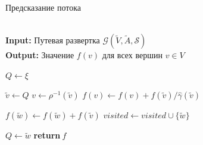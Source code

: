 \documentclass[14pt,autoref,href]{disser}
\theoremstyle{definition}
\begin{document}
\begin{algorithm}
\caption{Предсказание потока} \label{alg:flow_propagation}
\hspace*{\algorithmicindent} \\
\hspace*{\algorithmicindent} \textbf{Input:} Путевая развертка $\mathcal{G}(\widetilde{V}, \widetilde{A}, \mathscr{S})$ \\
\hspace*{\algorithmicindent} \textbf{Output:} Значение $f(v)$ для всех вершин $v\in V$
\begin{algorithmic}[1]
    \State $Q\gets \xi$
\EndFor

 \label{alg:flow_propagation:main_loop_begin}
    \State $\tilde{v}\gets Q$
    \State $v\gets \rho^{-1}(\tilde{v})$
    \State $f(v)\gets f(v) + f(\tilde{v}) / \hat{\gamma}(\tilde{v})$
    
        \State $f(\tilde{w})\gets f(\tilde{w}) + f(\tilde{v})$
        \State $visited\gets visited\cup \{\tilde{w}\}$
        
            \State $Q\gets \tilde{w}$
        \EndIf
    \EndFor
\EndWhile \label{alg:flow_propagation:main_loop_end}
\State \textbf{return}$\ f$
\EndProcedure
\end{algorithmic}
\end{algorithm}
\end{document}
